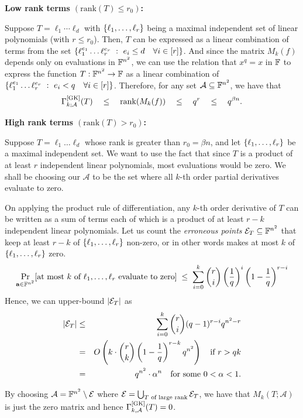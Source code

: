 \noindent 
{\bf Low rank terms $(\mathrm{rank}(T) \leq r_0)$:}

Suppose $T = \ell_1 \cdots \ell_d$ with $\left\{\ell_1, \dots, \ell_r\right\}$ being a maximal independent set of linear polynomials (with $r \leq r_0$). Then, $T$ can be expressed as a linear combination of terms from the set $\left\{{\ell_1^{e_1}\dots \ell_r^{e_r}}\ : \ {e_i\leq d \quad \forall i\in [r]}\right\}$. And since the matrix $M_k(f)$ depends only on evaluations in $\mathbb{F}^{n^2}$, we can use the relation that $x^q = x$ in $\mathbb{F}$ to express the function $T:\mathbb{F}^{n^2}\rightarrow \mathbb{F}$ as a linear combination of $\left\{{\ell_1^{e_1}\dots \ell_r^{e_r}}\ : \ {e_i<q \quad \forall i\in [r]}\right\}$. Therefore, for any set $\mathcal{A}\subseteq \mathbb{F}^{n^2}$, we have that
$$
\Gamma^{\mathrm{[GK]}}_{k;\mathcal{A}}(T) \quad \leq \quad
\mathrm{rank}(M_k(f)) \quad \leq \quad q^r \quad\leq \quad q^{\beta{n}}.
$$


\noindent
{\bf High rank terms $(\mathrm{rank}(T) > r_0)$:}

Suppose $T = \ell_1\dots \ell_d$ whose rank is greater than $r_0 = \beta n$, and let $\left\{\ell_1, \dots, \ell_r\right\}$ be a maximal independent set. We want to use the fact that since $T$ is a product of at least $r$ independent linear polynomials, most evaluations would be zero. We shall be choosing our $\mathcal{A}$ to be the set where all $k$-th order partial derivatives evaluate to zero.

On applying the product rule of differentiation, any $k$-th order derivative of $T$ can be written as a sum of terms each of which is a product of at least $r-k$ independent linear polynomials. Let us count the \emph{erroneous points} $\mathcal{E}_T\subseteq \mathbb{F}^{n^2}$ that keep at least $r-k$ of $\left\{\ell_1,\dots, \ell_r\right\}$ non-zero, or in other words makes at most $k$ of $\left\{\ell_1,\dots, \ell_r\right\}$ zero.
$$
\Pr_{\mathbf{a}\in \mathbb{F}^{n^2}}[\text{at most $k$ of $\ell_1,\dots,
  \ell_r$ evaluate to zero}] \;\leq \; \sum_{i=0}^k \binom{r}{i} \left(\frac{1}{q}\right)^i\left(1 - \frac{1}{q}\right)^{r-i}
$$
Hence, we can upper-bound $\left|\mathcal{E}_T\right|$ as
\begin{eqnarray*}
\left|\mathcal{E}_T\right| &\leq & \sum_{i=0}^k \binom{r}{i} (q-1)^{r-i}q^{n^2 - r}\\
 & = & O\left(k\cdot \binom{r}{k}\left(1 - \frac{1}{q}\right)^{r-k} q^{n^2}\right) \quad\text{if $r > qk$}\\
 & = & q^{n^2} \cdot \alpha^n\quad\text{for some $0< \alpha < 1$}.
 \end{eqnarray*}

 By choosing $\mathcal{A} = \mathbb{F}^{n^2} \setminus \mathcal{E}$ where $\mathcal{E} = \bigcup_{\text{$T$ of large rank}} \mathcal{E}_T$, we have that $M_k(T;\mathcal{A})$ is just the zero matrix and hence
 $\Gamma^{\mathrm{[GK]}}_{k,\mathcal{A}}(T) = 0$.\\



